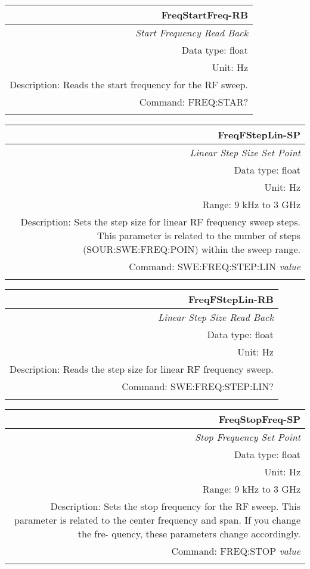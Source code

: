 \documentclass[openany]{article}
\begin{document}
		\begin{tabular}{N}
			\hline
			\bfseries FreqStartFreq-RB \\ \hline
			\emph{Start Frequency Read Back} \\
			Data type: float \\
			Unit: Hz \\
			Description: Reads the start frequency for the RF sweep. \\
			Command: FREQ:STAR? \\
			\\

		\end{tabular}


		\begin{tabular}{N}
			\hline
			\bfseries FreqFStepLin-SP \\ \hline
			\emph{Linear Step Size Set Point} \\
			Data type: float \\
			Unit: Hz \\
			Range: 9 kHz to 3 GHz \\
			Description: Sets the step size for linear RF frequency sweep steps. This parameter is related to the number of steps (SOUR:SWE:FREQ:POIN) within the sweep range. \\
			Command: SWE:FREQ:STEP:LIN \emph{value} \\
			\\
			
		\end{tabular}


		\begin{tabular}{N}
			\hline
			\bfseries FreqFStepLin-RB \\ \hline
			\emph{Linear Step Size Read Back} \\
			Data type: float \\
			Unit: Hz \\
			Description: Reads the step size for linear RF frequency sweep. \\
			Command: SWE:FREQ:STEP:LIN? \\
			\\

		\end{tabular}


		\begin{tabular}{N}
			\hline
			\bfseries FreqStopFreq-SP \\ \hline
			\emph{Stop Frequency Set Point} \\
			Data type: float \\
			Unit: Hz \\
			Range: 9 kHz to 3 GHz \\
			Description: Sets the stop frequency for the RF sweep.
This parameter is related to the center frequency and span. If you change the fre-
quency, these parameters change accordingly. \\
			Command: FREQ:STOP \emph{value} \\
			\\
			
		\end{tabular}
\end{document}
